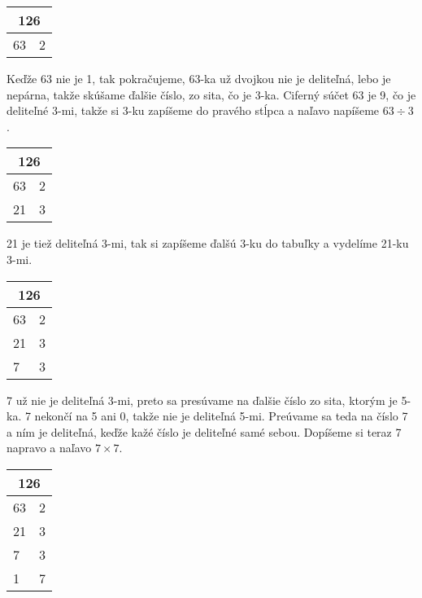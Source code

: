 \documentclass[12pt]{article}
\begin{document}
	\begin{table}[!hbt]
		\centering
		\begin{tabular}{|l|l|}
			\hline
			\multicolumn{2}{|c|}{126}\\
			\hline
			63& 2\\
			
			\hline
		\end{tabular}
	\end{table}
	Keďže 63 nie je 1, tak pokračujeme, 63-ka už dvojkou nie je deliteľná, lebo je nepárna, takže skúšame ďalšie číslo, zo sita, čo je 3-ka. Ciferný súčet 63 je 9, čo je deliteľné 3-mi, takže si 3-ku zapíšeme do pravého stĺpca a naľavo napíšeme $63 \div 3$.
	\newline
	\begin{table}[!hbt]
		\centering
		\begin{tabular}{|l|l|}
			\hline
			\multicolumn{2}{|c|}{126}\\
			\hline
			63& 2\\
			\hline
			21& 3\\
			
			\hline
		\end{tabular}
	\end{table}
	
	21 je tiež deliteľná 3-mi, tak si zapíšeme ďalšú 3-ku do tabuľky a vydelíme 21-ku 3-mi.
	\newline
	\begin{table}[!hbt]
		\centering
		\begin{tabular}{|l|l|}
			\hline
			\multicolumn{2}{|c|}{126}\\
			\hline
			63& 2\\
			\hline
			21& 3\\
			\hline
			7& 3\\
			
			\hline
		\end{tabular}
	\end{table}
	
	7 už nie je deliteľná 3-mi, preto sa presúvame na ďalšie číslo zo sita, ktorým je 5-ka. 7 nekončí na 5 ani 0, takže nie je deliteľná 5-mi. Preúvame sa teda na číslo 7 a ním je deliteľná, keďže kažé číslo je deliteľné samé sebou. Dopíšeme si teraz 7 napravo a naľavo $7 \times 7$.
	\newline
	\begin{table}[!hbt]
		\centering
		\begin{tabular}{|l|l|}
			\hline
			\multicolumn{2}{|c|}{126}\\
			\hline
			63& 2\\
			\hline
			21& 3\\
			\hline
			7& 3\\
			\hline
			1& 7\\
			
			\hline
		\end{tabular}
	\end{table}
	
\end{document}
